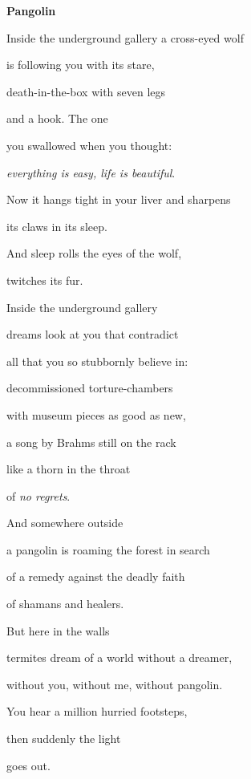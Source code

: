 \documentclass[a4paper]{article}
\begin{document}
{\bfseries
Pangolin}


\bigskip

Inside the underground gallery a cross-eyed wolf

is following you with its stare,

death-in-the-box with seven legs

and a hook. The one 

you swallowed when you thought:

\textit{everything is easy, life is beautiful}.

Now it hangs tight in your liver and sharpens

its claws in its sleep.

And sleep rolls the eyes of the wolf,

twitches its fur.


\bigskip

Inside the underground gallery 

dreams look at you that contradict 

all that you so stubbornly believe in:

decommissioned torture-chambers

with museum pieces as good as new,

a song by Brahms still on the rack

like a thorn in the throat

of \textit{no regrets}.


\bigskip

And somewhere outside

a pangolin is roaming the forest in search 

of a remedy against the deadly faith

of shamans and healers.


\bigskip

But here in the walls

termites dream of a world without a dreamer,

without you, without me, without pangolin.


\bigskip

You hear a million hurried footsteps,

then suddenly the light

goes out.


\bigskip


\bigskip


\bigskip

\end{document}
